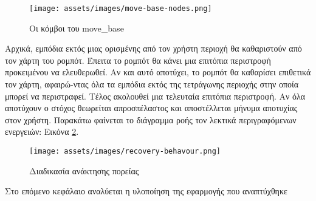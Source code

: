 \begin{figure}[!h]
	\centering
	\texttt{[image: assets/images/move-base-nodes.png]}
	\caption{Οι κόμβοι του move\_base}
	\label{fig:move-base-nodes}
\end{figure}

Αρχικά, εμπόδια εκτός μιας ορισμένης από τον χρήστη περιοχή θα καθαριστούν από τον χάρτη του ρομπότ. Έπειτα το ρομπότ θα κάνει μια επιτόπια περιστροφή προκειμένου να ελευθερωθεί. Αν και αυτό αποτύχει, το ρομπότ θα καθαρίσει επιθετικά τον χάρτη, αφαιρώ-ντας όλα τα εμπόδια εκτός της τετράγωνης περιοχής στην οποία μπορεί να περιστραφεί. Τέλος ακολουθεί μια τελευταία επιτόπια περιστροφή. Αν όλα αποτύχουν ο στόχος θεωρείται απροσπέλαστος και αποστέλλεται μήνυμα αποτυχίας στον χρήστη. Παρακάτω φαίνεται το διάγραμμα ροής τον λεκτικά περιγραφόμενων ενεργειών: Εικόνα \ref{fig:recovery-behavour}.

\begin{figure}[!h]
	\centering
	\texttt{[image: assets/images/recovery-behavour.png]}
	\caption{Διαδικασία ανάκτησης πορείας}
	\label{fig:recovery-behavour}
\end{figure}


Στο επόμενο κεφάλαιο αναλύεται η υλοποίηση της εφαρμογής που αναπτύχθηκε

\newpage
